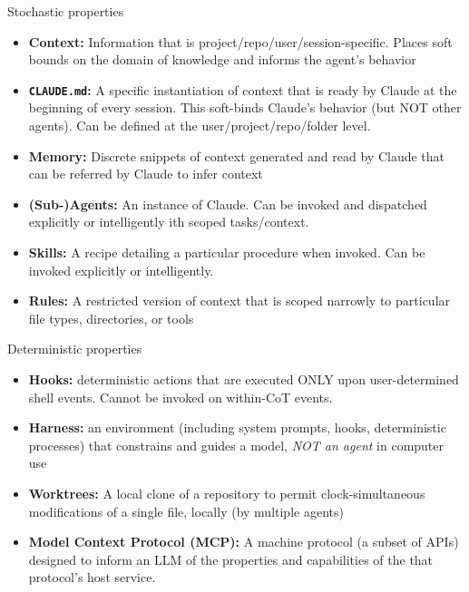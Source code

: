 \documentclass[aspectratio=1610, xcolor={dvipsnames}]{beamer}
\begin{document}
\begin{frame}{Stochastic properties}

    \begin{itemize}
        \item \textbf{Context:} Information that is project/repo/user/session-specific. Places soft bounds on the domain of knowledge and informs the agent's behavior
        \item \textbf{\texttt{CLAUDE.md}:} A specific instantiation of context that is ready by Claude at the beginning of every session. This soft-binds Claude's behavior (but NOT other agents). Can be defined at the user/project/repo/folder level.
        \item \textbf{Memory:} Discrete snippets of context generated and read by Claude that can be referred by Claude to infer context
        \item \textbf{(Sub-)Agents:} An instance of Claude. Can be invoked and dispatched explicitly or intelligently ith scoped tasks/context.
        \item \textbf{Skills:} A recipe detailing a particular procedure when invoked. Can be invoked explicitly or intelligently.
        \item \textbf{Rules:} A restricted version of context that is scoped narrowly to particular file types, directories, or tools
    \end{itemize}

\end{frame}

\begin{frame}{Deterministic properties}
    \begin{itemize}
        \item \textbf{Hooks:} deterministic actions that are executed ONLY upon user-determined shell events. Cannot be invoked on within-CoT events.
        \item \textbf{Harness:} an environment (including system prompts, hooks, deterministic processes) that constrains and guides a model, \textit{NOT an agent} in computer use
        \item \textbf{Worktrees:} A local clone of a repository to permit clock-simultaneous modifications of a single file, locally (by multiple agents)
        \item \textbf{Model Context Protocol (MCP):} A machine protocol (a subset of APIs) designed to inform an LLM of the properties and capabilities of the that protocol's host service.
    \end{itemize}
\end{frame}
\end{document}
